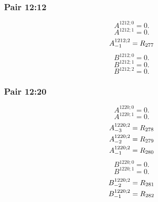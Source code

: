 \documentclass[11pt,a4paper]{article}
\begin{document}
\subsubsection{Pair 12:12}
\begin{equation}
A^{1212;0}=0.
\label{eq:cat-map-300}
\end{equation}
\begin{equation}
A^{1212;1}=0.
\label{eq:cat-map-301}
\end{equation}
\begin{equation}
\shortstack[l]{$\displaystyle A^{1212;2}_{-1}=R_{277}$}
\label{eq:cat-map-302}
\end{equation}
\begin{equation}
B^{1212;0}=0.
\label{eq:cat-map-303}
\end{equation}
\begin{equation}
B^{1212;1}=0.
\label{eq:cat-map-304}
\end{equation}
\begin{equation}
B^{1212;2}=0.
\label{eq:cat-map-305}
\end{equation}
\subsubsection{Pair 12:20}
\begin{equation}
A^{1220;0}=0.
\label{eq:cat-map-306}
\end{equation}
\begin{equation}
A^{1220;1}=0.
\label{eq:cat-map-307}
\end{equation}
\begin{equation}
\shortstack[l]{$\displaystyle A^{1220;2}_{-3}=R_{278}$\\
$\displaystyle A^{1220;2}_{-2}=R_{279}$\\
$\displaystyle A^{1220;2}_{-1}=R_{280}$}
\label{eq:cat-map-308}
\end{equation}
\begin{equation}
B^{1220;0}=0.
\label{eq:cat-map-309}
\end{equation}
\begin{equation}
B^{1220;1}=0.
\label{eq:cat-map-310}
\end{equation}
\begin{equation}
\shortstack[l]{$\displaystyle B^{1220;2}_{-2}=R_{281}$\\
$\displaystyle B^{1220;2}_{-1}=R_{282}$}
\label{eq:cat-map-311}
\end{equation}
\end{document}
